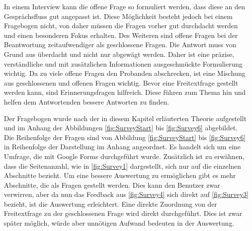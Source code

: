 In einem Interview kann die offene Frage so formuliert werden, dass diese an den Gesprächsfluss gut angepasst ist.
Diese Möglichkeit besteht jedoch bei einem Fragebogen nicht, von daher müssen die Fragen vorher gut durchdacht werden und einen besonderen Fokus erhalten.
Des Weiteren sind offene Fragen bei der Beantwortung zeitaufwendiger als geschlossene Fragen. 
Die Antwort muss von Grund aus überdacht und nicht nur abgewägt werden. 
Daher ist eine präzise, verständliche und mit zusätzlichen Informationen ausgeschmückte Formulierung wichtig. 
Da zu viele offene Fragen den Probanden abschrecken, ist eine Mischung aus geschlossenen und offenen Fragen wichtig.
Bevor eine Freitextfrage gestellt werden kann, sind Erinnerungsfragen hilfreich. Diese führen zum Thema hin und helfen dem Antwortenden bessere Antworten zu finden\autocite[S.35]{2009Fragebogen}.%


Der Fragebogen wurde nach der in diesem Kapitel erläuterten Theorie aufgestellt und im Anhang der Abbildungen \vref{fig:SurveyStart} bis \vref{fig:Survey6} abgebildet.
Die Reihenfolge der Fragen sind von Abbildung \ref{fig:SurveyStart} bis \ref{fig:Survey6} in Reihenfolge der Darstellung im Anhang angeordnet.
Es handelt sich um eine Umfrage, die mit Google Forms durchgeführt wurde.
Zusätzlich ist zu erwähnen, dass die Seitenanzahl, wie in \vref{fig:Survey1} dargestellt, sich nur auf die einzelnen Abschnitte bezieht.
Um eine bessere Auswertung zu ermöglichen gibt es mehr Abschnitte, die als Fragen gestellt werden. Dies kann den Benutzer zwar verwirren, aber da nun das Feedback aus \vref{fig:Survey4} sich direkt auf \vref{fig:Survey3} bezieht, ist die Auswertung erleichtert.    
Eine direkte Zuordnung von der Freitextfrage zu der geschlossenen Frage wird direkt durchgeführt. 
Dies ist zwar später möglich, würde aber unnötigen Aufwand bedeuten in der Auswertung.
